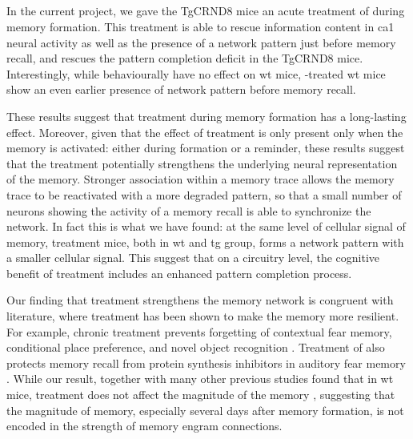 \subsection{\tglu}

In the current project, we gave the TgCRND8 mice an acute treatment of \tglu during memory formation. This treatment is able to rescue information content in \gls{ca1} neural activity as well as the presence of a network pattern just before memory recall, and rescues the pattern completion deficit in the TgCRND8 mice. Interestingly, while behaviourally \tglu have no effect on \gls{wt} mice, \tglu-treated \gls{wt} mice show an even earlier presence of network pattern before memory recall. 

These results suggest that \tglu treatment during memory formation has a long-lasting effect. Moreover, given that the effect of \tglu treatment is only present only when the memory is activated: either during formation or a reminder, these results suggest that the \tglu treatment potentially strengthens the underlying neural representation of the memory. Stronger association within a memory trace allows the memory trace to be reactivated with a more degraded pattern, so that a small number of neurons showing the activity of a memory recall is able to synchronize the network. In fact this is what we have found: at the same level of cellular signal of memory, \tglu treatment mice, both in \gls{wt} and \gls{tg} group, forms a network pattern with a smaller cellular signal. This suggest that on a circuitry level, the cognitive benefit of \tglu treatment includes an enhanced pattern completion process.

Our finding that \tglu treatment strengthens the memory network is congruent with literature, where \tglu treatment has been shown to make the memory more resilient. For example, chronic \tglu treatment prevents forgetting of contextual fear memory, conditional place preference, and novel object recognition \citep{dong15, migues16}. Treatment of \tglu also protects memory recall from protein synthesis inhibitors in auditory fear memory \citep{lopez15}.
While our result, together with many other previous studies found that in \gls{wt} mice, \tglu treatment does not affect the magnitude of the memory \citep{dias12, dong15, migues16}, suggesting that the magnitude of memory, especially several days after memory formation, is not encoded in the strength of memory engram connections. 

